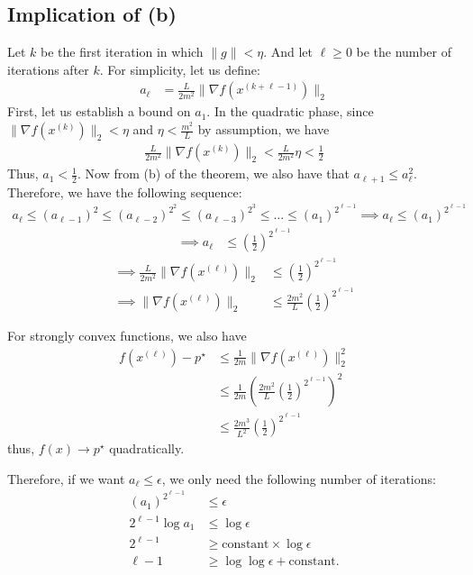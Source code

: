 \documentclass[12pt]{report}
\begin{document}
\subsection*{Implication of (b)}
Let $k$ be the first iteration in which $\|g\| < \eta$.  And let $\ell \geq 0$ be the number of iterations after $k$.  For simplicity, let us define:
\begin{align}
  a_\ell &= \frac{L}{2m^2} \|\nabla f(x^{(k+\ell - 1)}) \|_2
\end{align}
First, let us establish a bound on $a_1$.  In the quadratic phase, since $\|\nabla f(x^{(k)}) \|_2 < \eta$ and $\eta<\frac{m^2}{L}$ by assumption, we have
\begin{align*}
\frac{L}{2m^2} \|\nabla f(x^{(k)}) \|_2 < \frac{L}{2m^2} \eta < \frac{1}{2}
\end{align*}
Thus, $a_1 < \frac{1}{2}$.  Now from (b) of the theorem, we also have that $a_{\ell+1} \le a_{\ell}^2$.  Therefore, we have the following sequence:
\begin{align*}
a_\ell \le (a_{\ell-1})^2 \le (a_{\ell-2})^{2^2} \le (a_{\ell-3})^{2^3}\le \dots \le (a_{1})^{2^{\ell-1}}
\implies a_\ell \leq (a_{1})^{2^{\ell-1}}
\end{align*}
\begin{align*}
\implies a_\ell &\leq \left(\frac{1}{2}\right)^{2^{\ell-1}}
\end{align*}
\begin{align*}
\implies  \frac{L}{2m^2} \|\nabla f(x^{(\ell)}) \|_2 &\leq \left(\frac{1}{2}\right)^{2^{\ell-1}}\\
\implies  \|\nabla f(x^{(\ell)}) \|_2 &\leq \frac{2m^2}{L} \left(\frac{1}{2}\right)^{2^{\ell-1}}
\end{align*}

For strongly convex functions, we also have
\begin{align}
f(x^{(\ell)})-p^\star &\le \frac{1}{2m} \|\nabla f(x^{(\ell)}) \|_2^2 \\
&\leq \frac{1}{2m} \left( \frac{2m^2}{L} \left(\frac{1}{2}\right)^{2^{\ell-1}} \right)^2 \\
&\leq \frac{2m^3}{L^2} \left(\frac{1}{2}\right)^{2^{\ell-1}}
\end{align}
thus, $f(x)\to p^{\star}$ quadratically. 

Therefore, if we want $a_\ell \le \epsilon$, we only need the following number of iterations:
\begin{align*}
(a_{1})^{2^{\ell-1}} & \le \epsilon \\
2^{\ell-1} \log a_{1} & \le \log \epsilon \\
2^{\ell-1} & \ge \text{constant}\times \log \epsilon \\
\ell -1 & \ge \log \log \epsilon + \text{constant}.
\end{align*}
\end{document}
